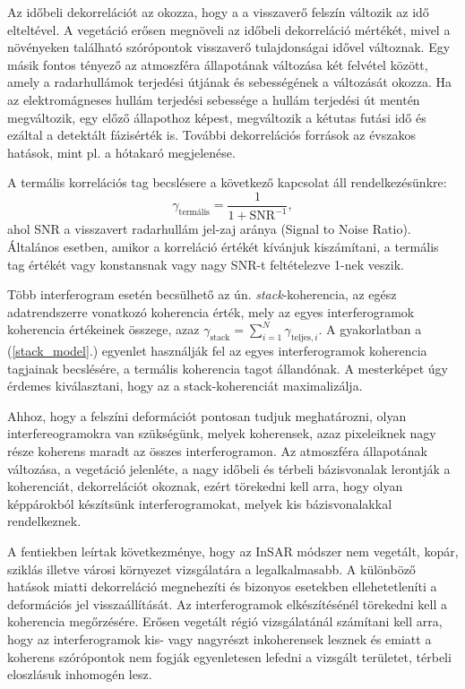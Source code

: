 \documentclass[12pt]{report}
\numberwithin{equation}{section}
\numberwithin{table}{section}
\numberwithin{figure}{section}
\begin{document}
Az időbeli dekorrelációt az okozza, hogy a a visszaverő felszín változik az idő elteltével. A vegetáció erősen megnöveli az időbeli dekorreláció mértékét, mivel a növényeken található szórópontok visszaverő tulajdonságai idővel változnak. Egy másik fontos tényező az atmoszféra állapotának változása két felvétel között, amely a radarhullámok terjedési útjának és sebességének a változását okozza. Ha az elektromágneses hullám terjedési sebessége a hullám terjedési út mentén megváltozik, egy előző állapothoz képest, megváltozik a kétutas futási idő és ezáltal a detektált fázisérték is. További dekorrelációs források az évszakos hatások, mint pl. a hótakaró megjelenése.

A termális korrelációs tag becslésere a következő kapcsolat áll rendelkezésünkre:
\[
    \gamma_{\text{termális}} = \frac{1}{1 + \text{SNR}^{-1}},
\]
ahol SNR a visszavert radarhullám jel-zaj aránya (Signal to Noise Ratio). Általános esetben, amikor a korreláció értékét kívánjuk kiszámítani, a termális tag értékét vagy konstansnak vagy nagy SNR-t feltételezve 1-nek veszik.

Több interferogram esetén becsülhető az ún. \textit{stack}-koherencia, az egész adatrendszerre vonatkozó koherencia érték, mely az egyes interferogramok koherencia értékeinek összege, azaz $\gamma_{\text{stack}} = \sum_{i=1}^{N} \gamma_{\text{teljes}, i}$. A gyakorlatban a (\ref{stack_model}.) egyenlet használják fel az egyes interferogramok koherencia tagjainak becslésére, a termális koherencia tagot állandónak. A mesterképet úgy érdemes kiválasztani, hogy az a stack-koherenciát maximalizálja.

Ahhoz, hogy a felszíni deformációt pontosan tudjuk meghatározni, olyan interfereogramokra van szükségünk, melyek koherensek, azaz pixeleiknek nagy része koherens maradt az összes interferogramon. Az atmoszféra állapotának változása, a vegetáció jelenléte, a nagy időbeli és térbeli bázisvonalak lerontják a koherenciát, dekorrelációt okoznak, ezért törekedni kell arra, hogy olyan képpárokból készítsünk interferogramokat, melyek kis bázisvonalakkal rendelkeznek.

A fentiekben leírtak következménye, hogy az InSAR módszer nem vegetált, kopár, sziklás illetve városi környezet vizsgálatára a legalkalmasabb. A különböző hatások miatti dekorreláció megnehezíti és bizonyos esetekben ellehetetleníti a deformációs jel visszaállítását. Az interferogramok elkészítésénél törekedni kell a koherencia megőrzésére. Erősen vegetált régió vizsgálatánál számítani kell arra, hogy az interferogramok kis- vagy nagyrészt inkoherensek lesznek és emiatt a koherens szórópontok nem fogják egyenletesen lefedni a vizsgált területet, térbeli eloszlásuk inhomogén lesz.
\end{document}
